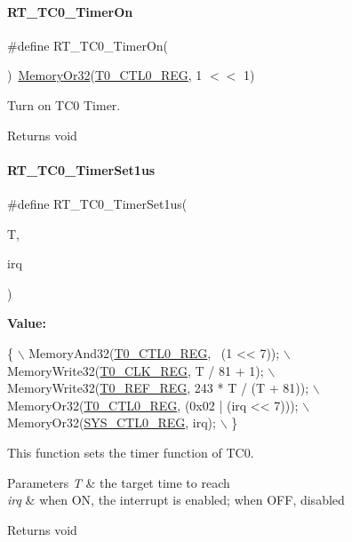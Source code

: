 \paragraph{\texorpdfstring{R\+T\+\_\+\+T\+C0\+\_\+\+Timer\+On}{RT\_TC0\_TimerOn}}
{\footnotesize\ttfamily \#define R\+T\+\_\+\+T\+C0\+\_\+\+Timer\+On(\begin{DoxyParamCaption}{ }\end{DoxyParamCaption})~\mbox{\hyperlink{a00068_a27874a97deab7cecdde5ddecf466e31e}{Memory\+Or32}}(\mbox{\hyperlink{a00068_ac94b0659ef32086a6752672082c0b3ed}{T0\+\_\+\+C\+T\+L0\+\_\+\+R\+EG}}, 1 $<$$<$ 1)}



Turn on T\+C0 Timer. 

\begin{DoxyReturn}{Returns}
void 
\end{DoxyReturn}
\mbox{\label{a00137_af8994aa8faed7529c93c25df30c020eb}} 
\paragraph{\texorpdfstring{R\+T\+\_\+\+T\+C0\+\_\+\+Timer\+Set1us}{RT\_TC0\_TimerSet1us}}
{\footnotesize\ttfamily \#define R\+T\+\_\+\+T\+C0\+\_\+\+Timer\+Set1us(\begin{DoxyParamCaption}\item[{}]{T,  }\item[{}]{irq }\end{DoxyParamCaption})}

{\bfseries Value\+:}
\begin{DoxyCode}
\{                                                  \(\backslash\)
        MemoryAnd32(\mbox{\hyperlink{a00068_ac94b0659ef32086a6752672082c0b3ed}{T0\_CTL0\_REG}}, ~(1 << 7));           \(\backslash\)
        MemoryWrite32(\mbox{\hyperlink{a00068_a02a329d71e5fe86e9a0a8513ea5e1630}{T0\_CLK\_REG}}, T / 81 + 1);         \(\backslash\)
        MemoryWrite32(\mbox{\hyperlink{a00068_a857679d0d1c771053cac56dc76c38caa}{T0\_REF\_REG}}, 243 * T / (T + 81)); \(\backslash\)
        MemoryOr32(\mbox{\hyperlink{a00068_ac94b0659ef32086a6752672082c0b3ed}{T0\_CTL0\_REG}}, (0x02 | (irq << 7)));  \(\backslash\)
        MemoryOr32(\mbox{\hyperlink{a00068_ab34acec79daf4fcc12a662cde9e75df7}{SYS\_CTL0\_REG}}, irq);                 \(\backslash\)
    \}
\end{DoxyCode}


This function sets the timer function of T\+C0. 


\begin{DoxyParams}{Parameters}
{\em T} & the target time to reach \\
\hline
{\em irq} & when ON, the interrupt is enabled; when O\+FF, disabled \\
\hline
\end{DoxyParams}
\begin{DoxyReturn}{Returns}
void 
\end{DoxyReturn}

